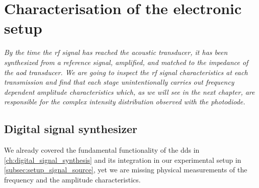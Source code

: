 \chapter{Characterisation of the electronic setup}

\textit{By the time the \gls{rf} signal has reached the acoustic transducer,
it has been synthesized from a reference signal, amplified, and matched to
the impedance of the \gls{aod} transducer. We are going to inspect the
\gls{rf} signal characteristics at each transmission and find that each stage
unintentionally carries out frequency dependent amplitude characteristics
which, as we will see in the next chapter, are responsible for the complex
intensity distribution observed with the photodiode.}

\section{Digital signal synthesizer}

We already covered the fundamental functionality of the \gls{dds} in
\cref{ch:digital_signal_synthesis} and its integration in our experimental
setup in \cref{subsec:setup_signal_source}, yet we are missing physical
measurements of the frequency and the amplitude characteristics.

